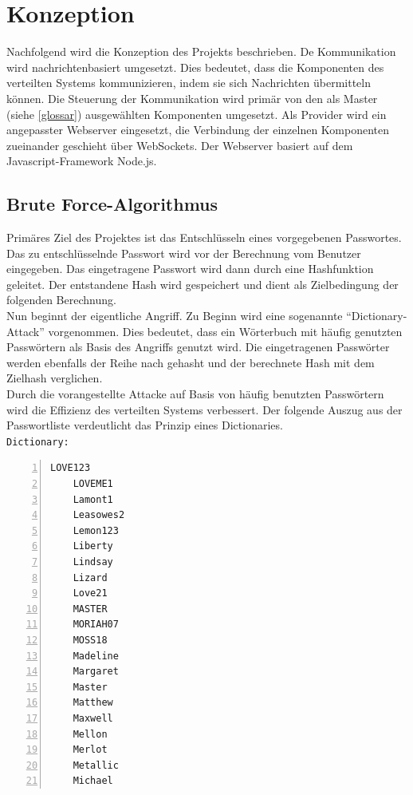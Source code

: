 \chapter{Konzeption}
\label{Konzeption}
Nachfolgend wird die Konzeption des Projekts beschrieben. 
De Kommunikation wird nachrichtenbasiert umgesetzt. Dies bedeutet, dass die Komponenten des verteilten Systems kommunizieren, indem sie sich Nachrichten übermitteln können. Die Steuerung der Kommunikation wird primär von den als Master 
(siehe \ref{glossar}) ausgewählten Komponenten umgesetzt. Als Provider wird ein angepasster Webserver eingesetzt, die Verbindung der einzelnen Komponenten zueinander geschieht über WebSockets. Der Webserver basiert auf dem Javascript-Framework Node.js. \\


\section{Brute Force-Algorithmus}
\label{ideeBruteForce}
Primäres Ziel des Projektes ist das Entschlüsseln eines vorgegebenen Passwortes. Das zu entschlüsselnde Passwort wird vor der Berechnung vom Benutzer eingegeben. Das eingetragene Passwort wird dann durch eine Hashfunktion geleitet. Der entstandene Hash wird gespeichert und dient als Zielbedingung der folgenden Berechnung. \\
Nun beginnt der eigentliche Angriff. Zu Beginn wird eine sogenannte \enquote{Dictionary-Attack} vorgenommen. Dies bedeutet, dass ein Wörterbuch mit häufig genutzten Passwörtern als Basis des Angriffs genutzt wird. Die eingetragenen Passwörter werden ebenfalls der Reihe nach gehasht und der berechnete Hash mit dem Zielhash verglichen. \\
 Durch die vorangestellte Attacke auf Basis von häufig benutzten Passwörtern wird die Effizienz des verteilten Systems verbessert. Der folgende Auszug aus der Passwortliste  verdeutlicht das Prinzip eines Dictionaries. \\
\texttt{Dictionary:}
\begin{lstlisting}[basicstyle=\ttfamily,numbers=left,numberstyle=\footnotesize\ttfamily,backgroundcolor=\color{sourcegray}]
	LOVE123
	LOVEME1
	Lamont1
	Leasowes2
	Lemon123
	Liberty
	Lindsay
	Lizard
	Love21
	MASTER
	MORIAH07
	MOSS18
	Madeline
	Margaret
	Master
	Matthew
	Maxwell
	Mellon
	Merlot
	Metallic
	Michael
\end{lstlisting}




